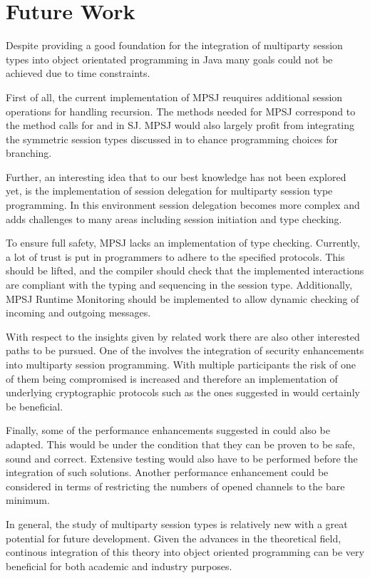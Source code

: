\cleardoublepage
\chapter{Future Work}
\label{ch:futurework}

Despite providing a good foundation for the integration of multiparty session types into object orientated programming in Java many goals could not be achieved due to time constraints.

First of all, the current implementation of MPSJ reuquires additional session operations for handling recursion. The methods needed for MPSJ correspond to the method calls for  and  in SJ. MPSJ would also largely profit from integrating the symmetric session types discussed in \cite{symmetric_sum} to ehance programming choices for branching.

Further, an interesting idea that to our best knowledge has not been explored yet, is the implementation of session delegation for multiparty session type programming. In this environment session delegation becomes more complex and adds challenges to many areas including session initiation and type checking.

To ensure full safety, MPSJ lacks an implementation of type checking. Currently, a lot of trust is put in programmers to adhere to the specified protocols. This should be lifted, and the compiler should check that the implemented interactions are compliant with the typing and sequencing in the session type. Additionally, MPSJ Runtime Monitoring should be implemented to allow dynamic checking of incoming and outgoing messages.

With respect to the insights given by related work there are also other interested paths to be pursued. One of the involves the integration of security enhancements into multiparty session programming. With multiple participants the risk of one of them being compromised is increased and therefore an implementation of underlying cryptographic protocols such as the ones suggested in \cite{crypto_mpst1, crypto_mpst2} would certainly be beneficial.

Finally, some of the performance enhancements suggested in \cite{sess_type_guided_distr_interact} could also be adapted. This would be under the condition that they can be proven to be safe, sound and correct. Extensive testing would also have to be performed before the integration of such solutions. Another performance enhancement could be considered in terms of restricting the numbers of opened channels to the bare minimum. 

In general, the study of multiparty session types is relatively new with a great potential for future development. Given the advances in the theoretical field, continous integration of this theory into object oriented programming can be very beneficial for both academic and industry purposes.

